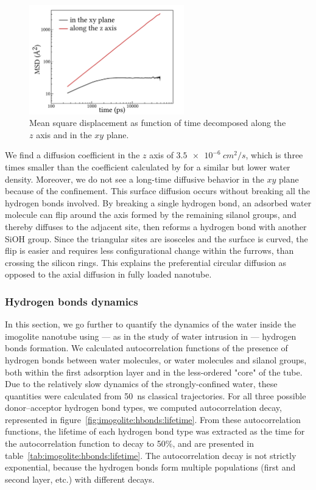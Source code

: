 \documentclass[thesis]{subfiles}
\begin{document}
\begin{figure}[ht]
    \centering
    \includegraphics[width=0.6\textwidth]{figures/images/imogolite-msd}
    \caption{Mean square displacement as function of time decomposed along the
    $z$ axis and in the $xy$ plane.}
    \label{fig:imogolite:msd}
\end{figure}

We find a diffusion coefficient in the $z$ axis of $\SI{3.5e-6}{cm^2/s}$, which
is three times smaller than the coefficient calculated by
\citeauthor{Zang2009}\cite{Zang2009} for a similar but lower water density.
Moreover, we do not see a long-time diffusive behavior in the $xy$ plane because
of the confinement. This surface diffusion occurs without breaking all the
hydrogen bonds involved. By breaking a single hydrogen bond, an adsorbed water
molecule can flip around the axis formed by the remaining silanol groups, and
thereby diffuses to the adjacent site, then reforms a hydrogen bond with another
SiOH group. Since the triangular sites are isosceles and the surface is curved,
the flip is easier and requires less configurational change within the furrows,
than crossing the silicon rings. This explains the preferential circular
diffusion as opposed to the axial diffusion in fully loaded nanotube.

\subsubsection{Hydrogen bonds dynamics}

In this section, we go further to quantify the dynamics of the water inside the
imogolite nanotube using --- as in the study of water intrusion in  ---
hydrogen bonds formation. We calculated autocorrelation functions of the
presence of hydrogen bonds between water molecules, or water molecules and
silanol groups, both within the first adsorption layer and in the less-ordered
"core" of the tube. Due to the relatively slow dynamics of the strongly-confined
water, these quantities were calculated from \SI{50}{ns} classical trajectories.
For all three possible donor--acceptor hydrogen bond types, we computed
autocorrelation decay, represented in
figure~\ref{fig:imogolite:hbonds:lifetime}. From these autocorrelation
functions, the lifetime of each hydrogen bond type was extracted as the time for
the autocorrelation function to decay to 50\%, and are presented in
table~\ref{tab:imogolite:hbonds:lifetime}. The autocorrelation decay is not
strictly exponential, because the hydrogen bonds form multiple populations
(first and second layer, etc.) with different decays.
\end{document}
